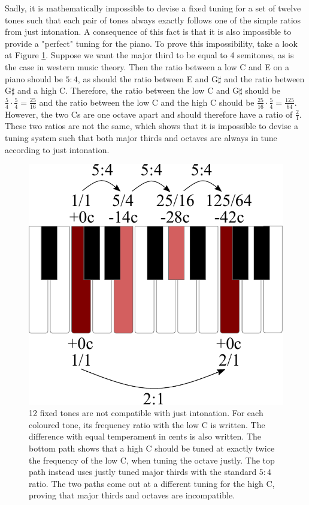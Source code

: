 \documentclass[a4paper]{article}
\begin{document}
Sadly, it is mathematically impossible to devise a fixed tuning for a set of twelve tones such that each pair of tones always exactly follows one of the simple ratios from just intonation. A consequence of this fact is that it is also impossible to provide a "perfect" tuning for the piano. To prove this impossibility, take a look at Figure \ref{fig:thirdsproof}. Suppose we want the major third to be equal to 4 semitones, as is the case in western music theory. Then the ratio between a low C and E on a piano should be $5:4$, as should the ratio between E and G$\sharp$ and the ratio between G$\sharp$ and a high C. Therefore, the ratio between the low C and G$\sharp$ should be $\frac54 \cdot \frac54 = \frac{25}{16}$ and the ratio between the low C and the high C should be $\frac{25}{16} \cdot \frac54 = \frac{125}{64}$. However, the two Cs are one octave apart and should therefore have a ratio of $\frac21$. These two ratios are not the same, which shows that it is impossible to devise a tuning system such that both major thirds and octaves are always in tune according to just intonation.

\begin{figure}
	\centering
	\includegraphics[width=0.6\linewidth]{Figures/ThirdsProof.pdf}
	\caption{12 fixed tones are not compatible with just intonation. For each coloured tone, its frequency ratio with the low C is written. The difference with equal temperament in cents is also written. The bottom path shows that a high C should be tuned at exactly twice the frequency of the low C, when tuning the octave justly. The top path instead uses justly tuned major thirds with the standard $5:4$ ratio. The two paths come out at a different tuning for the high C, proving that major thirds and octaves are incompatible.}
	\label{fig:thirdsproof}
\end{figure}
\end{document}
